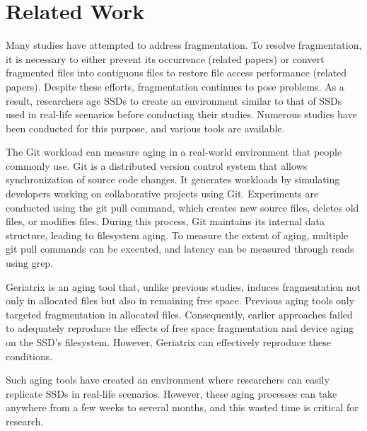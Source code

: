 \section{Related Work} %
\label{s:related}

Many studies have attempted to address fragmentation. 
To resolve fragmentation, it is necessary to either prevent its occurrence (related papers) or convert fragmented files into contiguous files to restore file access performance (related papers).
Despite these efforts, fragmentation continues to pose problems. As a result, researchers age SSDs to create an environment similar to that of SSDs used in real-life scenarios before conducting their studies. 
Numerous studies have been conducted for this purpose, and various tools are available.

The Git workload\cite{conway2017fragment} can measure aging in a real-world environment that people commonly use.
Git is a distributed version control system that allows synchronization of source code changes.
It generates workloads by simulating developers working on collaborative projects using Git. 
Experiments are conducted using the git pull command, which creates new source files, deletes old files, or modifies files. During this process, Git maintains its internal data structure, leading to filesystem aging.
To measure the extent of aging, multiple git pull commands can be executed, and latency can be measured through reads using grep.

Geriatrix\cite{Before_utilizer_Geriatrix} is an aging tool that, unlike previous studies, induces fragmentation not only in allocated files but also in remaining free space.
Previous aging tools only targeted fragmentation in allocated files. 
Consequently, earlier approaches failed to adequately reproduce the effects of free space fragmentation and device aging on the SSD's filesystem.
However, Geriatrix can effectively reproduce these conditions.

Such aging tools have created an environment where researchers can easily replicate SSDs in real-life scenarios.
However, these aging processes can take anywhere from a few weeks to several months, and this wasted time is critical for research.
